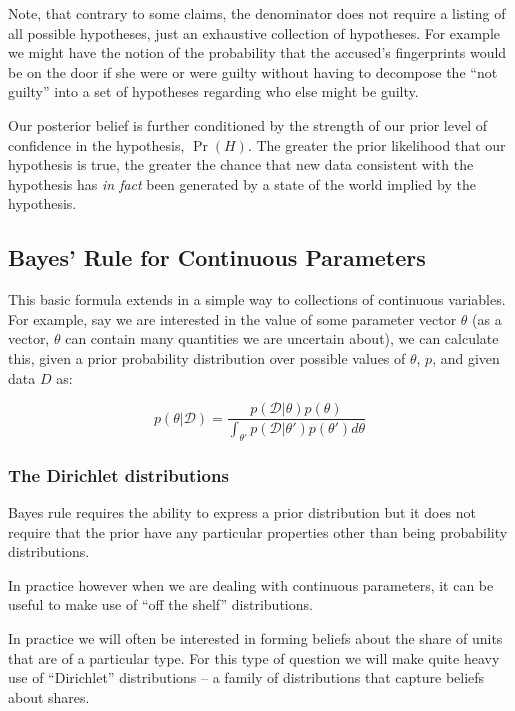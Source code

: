 \documentclass[12pt,]{book}
\begin{document}
Note, that contrary to some claims, the denominator does not require a listing of all possible hypotheses, just an exhaustive collection of hypotheses. For example we might have the notion of the probability that the accused's fingerprints would be on the door if she were or were guilty without having to decompose the ``not guilty'' into a set of hypotheses regarding who else might be guilty.

Our posterior belief is further conditioned by the strength of our prior level of confidence in the hypothesis, \(\Pr(H)\). The greater the prior likelihood that our hypothesis is true, the greater the chance that new data consistent with the hypothesis has \emph{in fact} been generated by a state of the world implied by the hypothesis.

\hypertarget{bayes-rule-for-continuous-parameters}{%
\subsection{Bayes' Rule for Continuous Parameters}\label{bayes-rule-for-continuous-parameters}}

This basic formula extends in a simple way to collections of continuous variables. For example, say we are interested in the value of some parameter vector \(\theta\) (as a vector, \(\theta\) can contain many quantities we are uncertain about), we can calculate this, given a prior probability distribution over possible values of \(\theta\), \(p\), and given data \(D\) as:

\[p(\theta|\mathcal{D})=\frac{p(\mathcal{D}|\theta)p(\theta)}{\int_{\theta'}p(\mathcal{D|\theta'})p(\theta')d\theta}\]

\hypertarget{the-dirichlet-distributions}{%
\subsubsection{The Dirichlet distributions}\label{the-dirichlet-distributions}}

Bayes rule requires the ability to express a prior distribution but it does not require that the prior have any particular properties other than being probability distributions.

In practice however when we are dealing with continuous parameters, it can be useful to make use of ``off the shelf'' distributions.

In practice we will often be interested in forming beliefs about the share of units that are of a particular type. For this type of question we will make quite heavy use of ``Dirichlet'' distributions -- a family of distributions that capture beliefs about shares.
\end{document}
